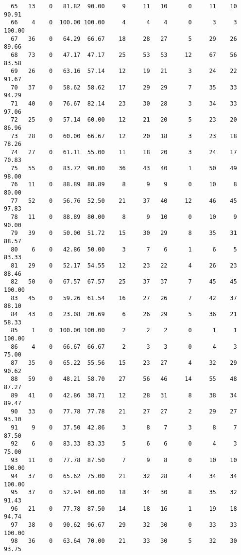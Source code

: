 \begin{verbatim}
  65   13    0   81.82  90.00     9     11   10      0     11    10    90.91
  66    4    0  100.00 100.00     4      4    4      0      3     3   100.00
  67   36    0   64.29  66.67    18     28   27      5     29    26    89.66
  68   73    0   47.17  47.17    25     53   53     12     67    56    83.58
  69   26    0   63.16  57.14    12     19   21      3     24    22    91.67
  70   37    0   58.62  58.62    17     29   29      7     35    33    94.29
  71   40    0   76.67  82.14    23     30   28      3     34    33    97.06
  72   25    0   57.14  60.00    12     21   20      5     23    20    86.96
  73   28    0   60.00  66.67    12     20   18      3     23    18    78.26
  74   27    0   61.11  55.00    11     18   20      3     24    17    70.83
  75   55    0   83.72  90.00    36     43   40      1     50    49    98.00
  76   11    0   88.89  88.89     8      9    9      0     10     8    80.00
  77   52    0   56.76  52.50    21     37   40     12     46    45    97.83
  78   11    0   88.89  80.00     8      9   10      0     10     9    90.00
  79   39    0   50.00  51.72    15     30   29      8     35    31    88.57
  80    6    0   42.86  50.00     3      7    6      1      6     5    83.33
  81   29    0   52.17  54.55    12     23   22      4     26    23    88.46
  82   50    0   67.57  67.57    25     37   37      7     45    45   100.00
  83   45    0   59.26  61.54    16     27   26      7     42    37    88.10
  84   43    0   23.08  20.69     6     26   29      5     36    21    58.33
  85    1    0  100.00 100.00     2      2    2      0      1     1   100.00
  86    4    0   66.67  66.67     2      3    3      0      4     3    75.00
  87   35    0   65.22  55.56    15     23   27      4     32    29    90.62
  88   59    0   48.21  58.70    27     56   46     14     55    48    87.27
  89   41    0   42.86  38.71    12     28   31      8     38    34    89.47
  90   33    0   77.78  77.78    21     27   27      2     29    27    93.10
  91    9    0   37.50  42.86     3      8    7      3      8     7    87.50
  92    6    0   83.33  83.33     5      6    6      0      4     3    75.00
  93   11    0   77.78  87.50     7      9    8      0     10    10   100.00
  94   37    0   65.62  75.00    21     32   28      4     34    34   100.00
  95   37    0   52.94  60.00    18     34   30      8     35    32    91.43
  96   21    0   77.78  87.50    14     18   16      1     19    18    94.74
  97   38    0   90.62  96.67    29     32   30      0     33    33   100.00
  98   36    0   63.64  70.00    21     33   30      5     32    30    93.75

\end{verbatim}
